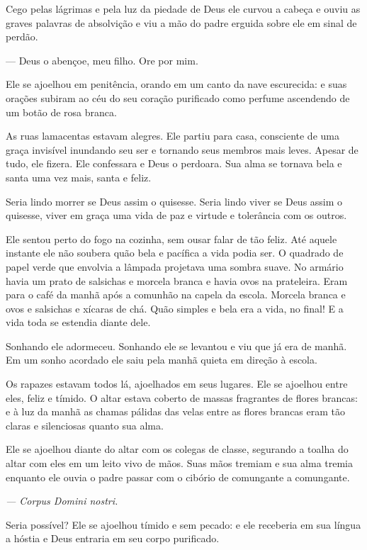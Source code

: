 Cego pelas lágrimas e pela luz da piedade de Deus ele curvou a cabeça e
ouviu as graves palavras de absolvição e viu a mão do padre erguida
sobre ele em sinal de perdão.

 --- Deus o abençoe, meu filho. Ore por mim.

Ele se ajoelhou em penitência, orando em um canto da nave escurecida: e
suas orações subiram ao céu do seu coração purificado como perfume
ascendendo de um botão de rosa branca.

As ruas lamacentas estavam alegres. Ele partiu para casa, consciente de
uma graça invisível inundando seu ser e tornando seus membros mais
leves. Apesar de tudo, ele fizera. Ele confessara e Deus o perdoara.
Sua alma se tornava bela e santa uma vez mais, santa e feliz.

Seria lindo morrer se Deus assim o quisesse. Seria lindo viver se Deus
assim o quisesse, viver em graça uma vida de paz e virtude e tolerância
com os outros.

Ele sentou perto do fogo na cozinha, sem ousar falar de tão feliz. Até
aquele instante ele não soubera quão bela e pacífica a vida podia ser.
O quadrado de papel verde que envolvia a lâmpada projetava uma sombra
suave. No armário havia um prato de salsichas e morcela branca e havia
ovos na prateleira. Eram para o café da manhã após a comunhão na capela
da escola. Morcela branca e ovos e salsichas e xícaras de chá. Quão
simples e bela era a vida, no final! E a vida toda se estendia diante
dele.

Sonhando ele adormeceu. Sonhando ele se levantou e viu que já era de
manhã. Em um sonho acordado ele saiu pela manhã quieta em direção à
escola.

Os rapazes estavam todos lá, ajoelhados em seus lugares. Ele se ajoelhou
entre eles, feliz e tímido. O altar estava coberto de massas fragrantes
de flores brancas: e à luz da manhã as chamas pálidas das velas entre
as flores brancas eram tão claras e silenciosas quanto sua alma.

Ele se ajoelhou diante do altar com os colegas de classe, segurando a
toalha do altar com eles em um leito vivo de mãos. Suas mãos
tremiam e sua alma tremia enquanto ele ouvia o padre passar com o
cibório de comungante a comungante.

{\itshape
 --- Corpus Domini nostri.}

Seria possível? Ele se ajoelhou tímido e sem pecado: e ele receberia em
sua língua a hóstia e Deus entraria em seu corpo purificado.

